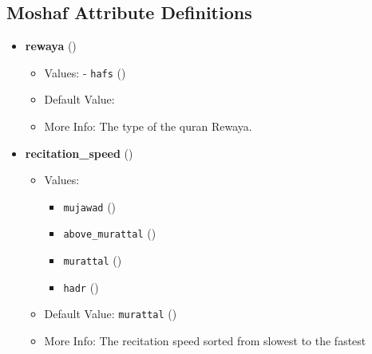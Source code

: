  \subsection{Moshaf Attribute Definitions}
\label{sec:moshaf_attributes}
\begin{itemize}
\item \textbf{rewaya} ()
  \begin{itemize}
  \item Values: - \texttt{hafs} ()
  \item Default Value: 
  \item More Info: The type of the quran Rewaya.
  \end{itemize}

\item \textbf{recitation\_speed} ()
  \begin{itemize}
  \item Values: 
    \begin{itemize}
    \item  \texttt{mujawad} ()
    \item  \texttt{above\_murattal} ()
    \item  \texttt{murattal} ()
    \item  \texttt{hadr} ()
    \end{itemize}
  \item Default Value: \texttt{murattal} ()
  \item More Info: The recitation speed sorted from slowest to the fastest 
  \end{itemize}


\end{itemize}
